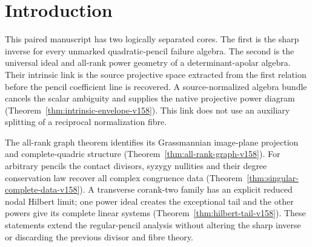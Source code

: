 \begin{abstract}
An unmarked, ungraded finite multiplication-failure algebra recovers
every complex quadratic pencil at the sharp order $n^2+2n-4$, including
singular pencils. The inverse reconstructs the tensor rulings and
orients them by unequal coefficient-support ranks. Before recovering
the pencil coefficient line, its first relation already determines
the native source projective space. We construct on that space a
source-normalized determinant-apolar algebra bundle and its projective
power diagram, functorially under arbitrary ungraded algebra
isomorphisms. Scalar twists cancel in the algebra bundle, so no
splitting of an auxiliary normalization fibre is used. The relative
inverse and the detailed geometric and local forms are included.
The companion identifies all-rank power graphs and singular-pencil
invariants, computes simultaneous ordinary-collision Hilbert fibres
with every tail power map, and gives positive-dimensional residual-pencil
moduli in an incidence fibre. This master preserves the complete
mathematical contents of the two focused papers; it is not a third
submission.
\end{abstract}
\maketitle
\section{Introduction}
\label{sec:introduction-v153}
This paired manuscript has two logically separated cores. The first
is the sharp inverse for every unmarked quadratic-pencil failure
algebra. The second is the universal ideal and all-rank power geometry
of a determinant-apolar algebra. Their intrinsic link is the source
projective space extracted from the first relation before the pencil
coefficient line is recovered. A source-normalized algebra bundle
cancels the scalar ambiguity and supplies the native projective power
diagram (Theorem~\ref{thm:intrinsic-envelope-v158}). This link does not
use an auxiliary splitting of a reciprocal normalization fibre.

The all-rank graph theorem identifies its Grassmannian image-plane
projection and complete-quadric structure
(Theorem~\ref{thm:all-rank-graph-v158}). For arbitrary pencils the
contact divisors, syzygy nullities and their degree conservation law
recover all complex congruence data
(Theorem~\ref{thm:singular-complete-data-v158}). A transverse
corank-two family has an explicit reduced nodal Hilbert limit; one
power ideal creates the exceptional tail and the other powers give
its complete linear systems (Theorem~\ref{thm:hilbert-tail-v158}).
These statements extend the regular-pencil analysis without altering
the sharp inverse or discarding the previous divisor and fibre theory.

